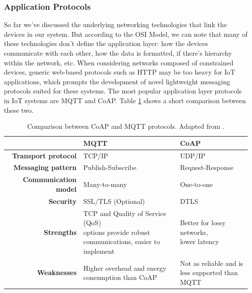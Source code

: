 \subsubsection{Application Protocols}

So far we've discussed the underlying networking technologies that link the devices in our system. But according to the OSI Model, we can note that many of these technologies don't define the application layer: how the devices communicate with each other, how the data is formatted, if there's hierarchy within the network, etc. When considering networks composed of constrained devices, generic web-based protocols such as HTTP may be too heavy for \acs{IoT} applications, which prompts the development of novel lightweight messaging protocols suited for these systems. The most popular application layer protocols in \acs{IoT} systems are \acf{MQTT} and \acf{CoAP}. Table \ref{tab:comparsion-applicationprotocols} shows a short comparison between these two. \bigskip

\renewcommand{\arraystretch}{1.5}
\begin{table}[H]
    \centering
    \begin{tabular}{r|l|l}
        & \textbf{\acs{MQTT}}& \textbf{\acs{CoAP}}  \\ \hline
        \textbf{Transport protocol} & TCP/IP & UDP/IP \\
        \textbf{Messaging pattern} & Publish-Subscribe & Request-Response \\
        \textbf{Communication model} & Many-to-many & One-to-one \\
        \textbf{Security} & SSL/TLS (Optional) & DTLS \\
        \textbf{Strengths} & \makecell{TCP and Quality of Service (QoS)\\ options provide robust \\communications, easier to implement } & \makecell{Better for lossy networks,\\ lower latency} \\
        \textbf{Weaknesses} & \makecell{Higher overhead and energy\\ consumption than \acs{CoAP}} & \makecell{Not as reliable and is\\less supported than MQTT} \\
    \end{tabular}
    \caption[Comparison between \acs{CoAP} and \acs{MQTT} protocols.]{Comparison between \acs{CoAP} and \acs{MQTT} protocols. Adapted from \cite{10.5555/3161403}.}
    \label{tab:comparsion-applicationprotocols}
\end{table} 
\renewcommand{\arraystretch}{1}

